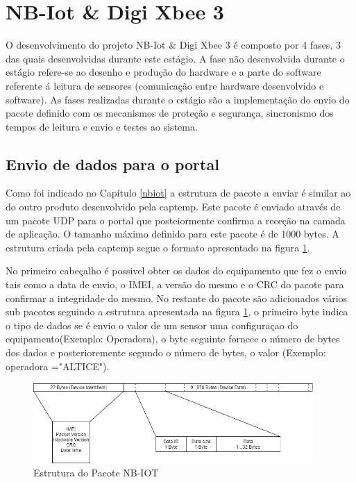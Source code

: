 \section {NB-Iot \& Digi Xbee 3 }
\par
O desenvolvimento do projeto NB-Iot \& Digi Xbee 3  é composto por 4 fases, 3 das quais desenvolvidas durante este estágio. A fase não desenvolvida durante o estágio refere-se ao desenho e produção do hardware e a parte do software referente á leitura de sensores (comunicação entre hardware desenvolvido e software). As fases realizadas durante o estágio são a implementação do envio do pacote definido com os mecanismos de proteção e segurança, sincronismo dos tempos de leitura e envio e testes ao sistema.

\subsection {Envio de dados para o portal}

\par Como foi indicado no Capítulo \ref{nbiot} a estrutura de pacote a enviar é similar ao do outro produto desenvolvido pela captemp. Este pacote é enviado através de um pacote UDP para o portal que posteiormente confirma a receção na camada de aplicação. O tamanho máximo definido para este pacote é de 1000 bytes.
A estrutura criada pela captemp segue o formato apresentado na figura \ref{packet}.
\par No primeiro cabeçalho é possivel obter os dados do equipamento que fez o envio tais como a data de envio, o IMEI, a versão do mesmo e o CRC do pacote para confirmar a integridade do mesmo. No restante do pacote são adicionados vários sub pacotes seguindo a estrutura apresentada na figura \ref {packet}, o primeiro byte indica o tipo de dados se é envio o valor de um sensor uma configuraçao do equipamento(Exemplo: Operadora), o byte seguinte fornece o número de bytes dos dados e posterioremente segundo o número de bytes, o valor (Exemplo: operadora ="ALTICE").

 \begin{figure}[ht]
\centering
\includegraphics[width=0.95\textwidth]{images/packetnb.png}
\caption{Estrutura do Pacote NB-IOT}\label{packet}
\end{figure}

